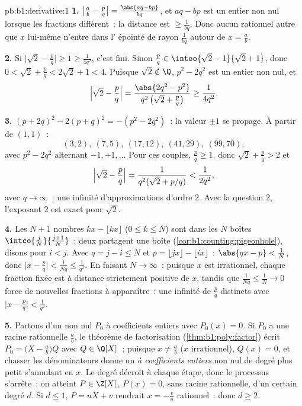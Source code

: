 \begin{solution}{pb:b1:derivative:1}
\textbf{1.} $\bigl|\frac ab - \frac pq\bigr| = \frac{\abs{aq -
bp}}{bq}$, et $aq - bp$ est un entier non nul lorsque les fractions
diffèrent~: la distance est $\geq \frac{1}{bq}$. Donc aucun rationnel
autre que $x$ lui-même n'entre dans l' épointé de rayon
$\frac{1}{bq}$ autour de $x = \frac ab$.

\textbf{2.} Si $\bigl|\sqrt2 - \frac pq\bigr| \geq 1 \geq
\frac{1}{4q^2}$, c'est fini. Sinon $\frac pq \in \intoo{\sqrt2 -
1}{\sqrt2 + 1}$, donc $0 < \sqrt2 + \frac pq < 2\sqrt2 + 1 < 4$.
Puisque $\sqrt 2 \notin \Q$, $p^2 - 2q^2$ est un entier non nul, et
\[
\Bigl|\sqrt2 - \frac pq\Bigr|
= \frac{\abs{2q^2 - p^2}}{q^2\,\bigl(\sqrt2 + \frac pq\bigr)}
\geq \frac{1}{4q^2} .
\]

\textbf{3.} $(p + 2q)^2 - 2(p + q)^2 = -(p^2 - 2q^2)$~: la valeur
$\pm1$ se propage. À partir de $(1,1)$~:
\[
(3,2),\ (7,5),\ (17,12),\ (41,29),\ (99,70),
\]
avec $p^2 - 2q^2$ alternant $-1, +1, \dots$
Pour ces couples, $\frac pq \geq 1$, donc $\sqrt2 + \frac pq > 2$ et
\[
\Bigl|\sqrt2 - \frac pq\Bigr| =
\frac{1}{q^2(\sqrt2 + p/q)} < \frac{1}{2q^2} ,
\]
avec $q \to \infty$~: une infinité d'approximations d'ordre $2$.
Avec la question 2, l'exposant $2$ est exact pour $\sqrt 2$.

\textbf{4.} Les $N + 1$ nombres $kx - \lfloor kx\rfloor$ ($0
\leq k \leq N$) sont dans les $N$ boîtes $\intco{\frac
jN}{\frac{j+1}{N}}$~: deux partagent une boîte
(\cref{cor:b1:counting:pigeonhole}), disons pour $i < j$. Avec $q =
j - i \leq N$ et $p = \lfloor jx\rfloor - \lfloor ix\rfloor$~:
$\abs{qx - p} < \frac1N$, donc $\bigl|x - \frac pq\bigr| <
\frac{1}{Nq} \leq \frac{1}{q^2}$. En faisant $N \to \infty$~: puisque
$x$ est irrationnel, chaque fraction fixée est à distance strictement positive de
$x$, tandis que $\frac{1}{Nq} \leq \frac 1N \to 0$ force de nouvelles
fractions à apparaître~: une infinité de $\frac pq$ distincts avec
$\bigl|x - \frac pq\bigr| < \frac{1}{q^2}$.

\textbf{5.} Partons d'un  non nul $P_0$ à coefficients entiers avec $P_0(x) =
0$. Si $P_0$ a une racine rationnelle $\frac ab$, le théorème de factorisation
(\cref{thm:b1:poly:factor}) écrit $P_0 = \bigl(X - \frac
ab\bigr)Q$ avec $Q \in \Q[X]$~;
puisque $x \neq \frac ab$ ($x$ irrationnel), $Q(x) = 0$, et
chasser les dénominateurs donne un  \emph{à coefficients entiers} non nul
de degré plus petit s'annulant en $x$. Le degré décroît à chaque
étape, donc le processus s'arrête~: on atteint $P \in \Z[X]$, $P(x) = 0$,
sans racine rationnelle, d'un certain degré $d$. Si $d \leq 1$, $P =
uX + v$ rendrait $x = -\frac vu$ rationnel~: donc $d \geq 2$.


\end{solution}
